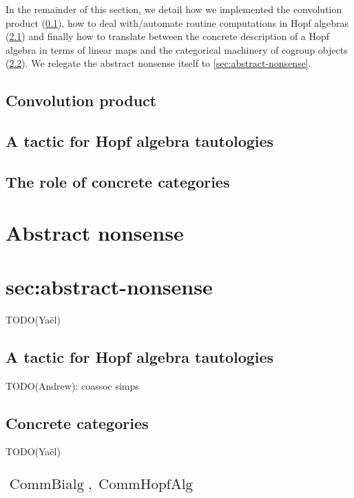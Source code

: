 \documentclass{article}
\DeclareMathOperator{\CommBialg}{CommBialg}
\DeclareMathOperator{\CommHopfAlg}{CommHopfAlg}
\begin{document}
In the remainder of this section,
we detail how we implemented the convolution product (\cref{sec:conv-prod}),
how to deal with/automate routine computations in Hopf algebras (\cref{sec:coassoc-simps})
and finally how to translate between the concrete description of a Hopf algebra in terms
of linear maps and the categorical machinery of cogroup objects (\cref{sec:concrete-categories}).
We relegate the abstract nonsense itself to \cref{sec:abstract-nonsense}.


\subsection{Convolution product}\label{sec:conv-prod}



\subsection{A tactic for Hopf algebra tautologies}



\subsection{The role of concrete categories}\label{sec:concrete-categories}



\section{Abstract nonsense}\section{sec:abstract-nonsense}


TODO(Yaël)


\subsection{A tactic for Hopf algebra tautologies}\label{sec:coassoc-simps}


TODO(Andrew): coassoc simps


\subsection{Concrete categories}\label{sec:concrete-categories}


TODO(Yaël)


\subsection{\texorpdfstring{$\CommBialg, \CommHopfAlg$}{CommBialg, CommHopfAlg}}\label{sec:comm-hopf-alg}
\end{document}
